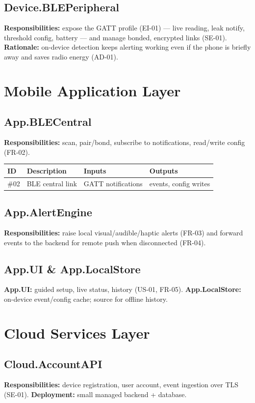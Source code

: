 \documentclass[11pt,letterpaper]{article}
\begin{document}
\subsection{Device.BLEPeripheral}
\textbf{Responsibilities:} expose the GATT profile (EI-01) --- live reading, leak
notify, threshold config, battery --- and manage bonded, encrypted links (SE-01).
\textbf{Rationale:} on-device detection keeps alerting working even if the phone is
briefly away and saves radio energy (AD-01).

\section{Mobile Application Layer}
\subsection{App.BLECentral}
\textbf{Responsibilities:} scan, pair/bond, subscribe to notifications, read/write
config (FR-02).
\begin{table}[H]\begin{center}\begin{tabular}{ | p{1cm} | p{6cm} | p{2.6cm} | p{2.6cm} |}\hline
ID & Description & Inputs & Outputs \\ \hline
\#02 & BLE central link & GATT notifications & events, config writes \\ \hline
\end{tabular}\end{center}\end{table}
\subsection{App.AlertEngine}
\textbf{Responsibilities:} raise local visual/audible/haptic alerts (FR-03) and
forward events to the backend for remote push when disconnected (FR-04).
\subsection{App.UI \& App.LocalStore}
\textbf{App.UI:} guided setup, live status, history (US-01, FR-05). \textbf{App.LocalStore:}
on-device event/config cache; source for offline history.

\section{Cloud Services Layer}
\subsection{Cloud.AccountAPI}
\textbf{Responsibilities:} device registration, user account, event ingestion over
TLS (SE-01). \textbf{Deployment:} small managed backend + database.
\end{document}
